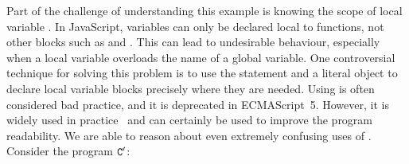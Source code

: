 \documentclass{article}
\begin{document}
% 

Part of the challenge of understanding this example is knowing the scope of
local variable . In JavaScript, variables can only be declared local
to functions, not  other blocks such as  and . This can lead
to undesirable behaviour, especially when a local variable overloads the name of a global
variable. One controversial technique for solving this problem is to use the
 statement  and a literal object to declare local variable blocks
precisely where they are needed. Using    is often
considered bad practice, and it is deprecated in ECMAScript~5. However,  it is widely used in
practice~\cite{Richards2010,RyuFOOL2011}  and can certainly be used to improve the program 
readability. We are able to reason about even extremely confusing uses of .
 Consider the program $\mbox{\texttt{{\upshape C}}}'$:
\end{document}
